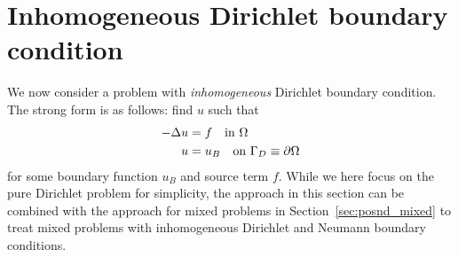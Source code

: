 

\section{Inhomogeneous Dirichlet boundary condition}
\label{sec:posnd_inhomo_bc}
We now consider a problem with \emph{inhomogeneous} Dirichlet boundary condition.  The strong form is as follows: find $u$ such that
\begin{align}
  -\Delta u &= f \quad \text{in } \Omega \label{eq:posnd_inhomo_bc_strong} \\
  u &= u_B \quad \text{on } \Gamma_D \equiv \partial \Omega \notag
\end{align}
for some boundary function $u_B$ and source term $f$. While we here focus on the pure Dirichlet problem for simplicity, the approach in this section can be combined with the approach for mixed problems in Section~\ref{sec:posnd_mixed} to treat mixed problems with inhomogeneous Dirichlet and Neumann boundary conditions.

